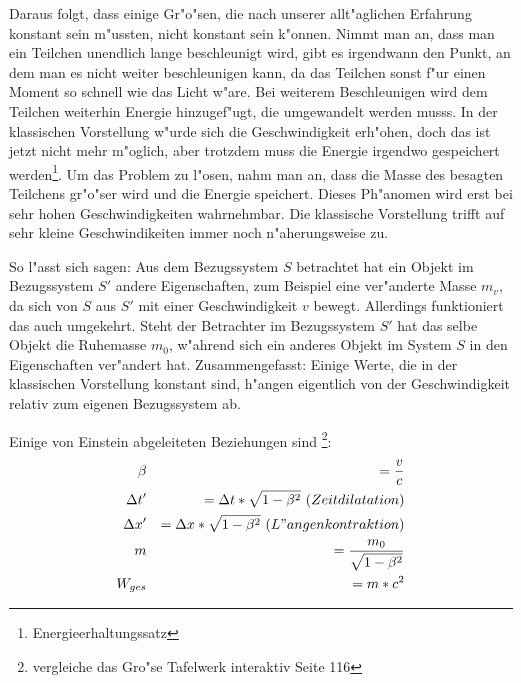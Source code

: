 \documentclass[14pt, a4paper]{report}
\begin{document}
Daraus folgt, dass einige Gr"o"sen, die nach unserer allt"aglichen Erfahrung konstant
sein m"ussten, nicht konstant sein k"onnen. Nimmt man an, dass man ein Teilchen 
unendlich lange beschleunigt wird, gibt es irgendwann den Punkt, an dem man es nicht weiter
beschleunigen kann, da das Teilchen sonst f"ur einen Moment so schnell wie das Licht 
w"are. Bei weiterem Beschleunigen wird dem Teilchen weiterhin Energie hinzugef"ugt, die 
umgewandelt werden musss.  In der klassischen Vorstellung 
w"urde sich die Geschwindigkeit erh"ohen, doch das ist jetzt nicht mehr m"oglich, aber 
trotzdem muss die Energie irgendwo gespeichert werden\footnote{Energieerhaltungssatz}. 
Um das Problem zu l"osen, nahm man an, dass die Masse des besagten Teilchens gr"o"ser 
wird und die Energie speichert. 
Dieses Ph"anomen wird erst bei sehr hohen Geschwindigkeiten wahrnehmbar. Die klassische 
Vorstellung trifft auf sehr kleine Geschwindikeiten immer noch n"aherungsweise zu.

So l"asst sich sagen: Aus dem Bezugssystem $S$ betrachtet hat 
ein Objekt im Bezugssystem $S'$ andere Eigenschaften, zum Beispiel eine ver"anderte 
Masse $m_v$, da sich von $S$ aus $S'$ mit einer Geschwindigkeit $v$ bewegt. 
Allerdings funktioniert das auch umgekehrt. Steht der Betrachter im Bezugssystem $S'$ 
hat das selbe Objekt die Ruhemasse $m_0$, w"ahrend sich ein anderes Objekt im System $S$ 
in den Eigenschaften ver"andert hat. Zusammengefasst: Einige Werte, die in der 
klassischen Vorstellung konstant sind, h"angen eigentlich von der Geschwindigkeit 
relativ zum eigenen Bezugssystem ab.

Einige von Einstein abgeleiteten Beziehungen sind 
\footnote{vergleiche das Gro"se Tafelwerk interaktiv Seite 116 }:
\begin{eqnarray}
\beta && = \frac{v}{c} \\
\Delta t' && = \Delta t * \sqrt{1 - \beta^2} ~ (Zeitdilatation) \\
\Delta x' && = \Delta x * \sqrt{1 - \beta^2} ~ (L"angenkontraktion) \\
m && = \frac{m_0}{\sqrt{1 - \beta^2}} \label{var_m} \\
W_{ges} && = m * c^2 \label{mc_square}
\end{eqnarray}
\end{document}
